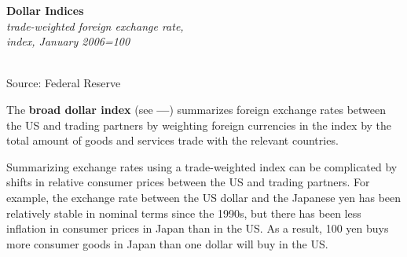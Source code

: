 \documentclass{report}
\makeatletter
\newcommand{\tbllink}[1]{\href{https://raw.githubusercontent.com/bdecon/US-chartbook/master/chartbook/data/#1}{\faTable}}
\newcommand*\short[1]{\expandafter\@gobbletwo\number\numexpr#1\relax}
\newcommand{\absnode}[3]{\node[below right, align=left] at (axis cs: #1,#2) {#3};}
\newcommand{\dateaxisticks}{
		date coordinates in=x, axis line style={draw=none},
		xmax={2022-03-15},
		max space between ticks=40,	    
		xtick={{1990-01-01}, {1992-01-01}, {1994-01-01}, 
			{1996-01-01}, {1998-01-01}, {2000-01-01}, 
			{2002-01-01}, {2004-01-01}, {2006-01-01},
			{2008-01-01}, {2010-01-01}, {2012-01-01}, {2014-01-01},
		    {2016-01-01}, {2018-01-01}, {2020-01-01}, {2022-01-01}, 
		    {2024-01-01}, {2026-01-01}},
		minor xtick={{1989-01-01}, {1991-01-01}, {1993-01-01},
			{1995-01-01}, {1997-01-01}, {1999-01-01}, 
			{2001-01-01}, {2003-01-01}, {2005-01-01}, {2007-01-01},
		    {2009-01-01}, {2011-01-01}, {2013-01-01}, {2015-01-01},
		    {2017-01-01}, {2019-01-01}, {2021-01-01}, {2023-01-01}, 
		    {2025-01-01}, {2027-01-01}},
		enlarge y limits={0.06}, enlarge x limits={0.01},
		}
\newcommand{\bbar}[2]{extra #1 ticks = {{#2}}, extra #1 tick labels = ,
		extra #1 tick style = {grid=major, grid style={thick, black!25}},}
\newcommand{\stdline}[4]{\addplot[very thick, no markers, color=#1] 
		table [x=#2, y=#3, col sep=comma] {#4};	}
\newcommand{\recbars}{
		\fill[color=black!10] (axis cs:{2007-12-01},\pgfkeysvalueof{/pgfplots/ymin}) rectangle 
			(axis cs:{2009-07-01}, \pgfkeysvalueof{/pgfplots/ymax});
		\fill[color=black!10] (axis cs:{2020-02-01},\pgfkeysvalueof{/pgfplots/ymin}) rectangle 
			(axis cs:{2020-05-01}, \pgfkeysvalueof{/pgfplots/ymax});}
\makeatother
\begin{document}
{\begin{minipage}{0.76\textwidth}
\begin{minipage}{0.46\textwidth}
\normalsize \textbf{Dollar Indices}\\
\footnotesize{\textit{trade-weighted foreign exchange rate,}}\\
\footnotesize{\textit{index, January 2006=100}}\\
\hspace*{-2mm} \\
\footnotesize{Source: Federal Reserve} \hfill \tbllink{fx_idx.csv}
\end{minipage}\hfill
\begin{minipage}{0.45\textwidth}
\small The \textbf{broad dollar index} (see {\color{blue!60!black}\textbf{---}}) summarizes foreign exchange rates between the US and trading partners by weighting foreign currencies in the index by the total amount of goods and services trade with the relevant countries.




\end{minipage}
\end{minipage}
\newpage
\begin{minipage}{0.76\textwidth}
\small Summarizing exchange rates using a trade-weighted index can be complicated by shifts in relative consumer prices between the US and trading partners. For example, the exchange rate between the US dollar and the Japanese yen has been relatively stable in nominal terms since the 1990s, but there has been less inflation in consumer prices in Japan than in the US. As a result, 100 yen buys more consumer goods in Japan than one dollar will buy in the US. 


\end{minipage}}
\end{document}

